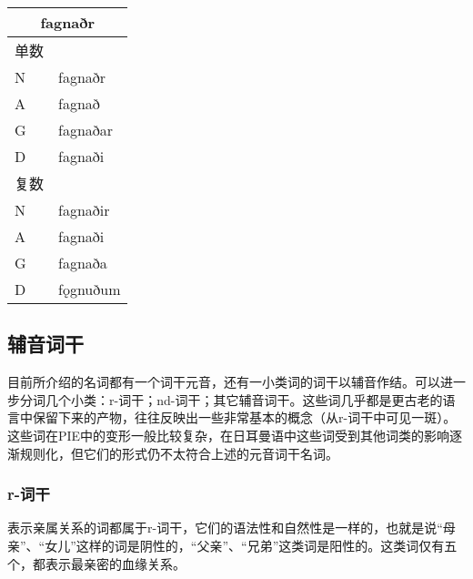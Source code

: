 \begin{longtable}{ll}
  \toprule
  \multicolumn{2}{c}{\textbf{fagnaðr}} \\
  \midrule
  \endhead
  \bottomrule
  \endfoot
  单数 &                               \\
  N    & fagnaðr                       \\
  A    & fagnað                        \\
  G    & fagnaðar                      \\
  D    & fagnaði                       \\
  复数 &                               \\
  N    & fagnaðir                      \\
  A    & fagnaði                       \\
  G    & fagnaða                       \\
  D    & fǫgnuðum                      \\
\end{longtable}

\subsection{辅音词干}
\label{辅音词干}

目前所介绍的名词都有一个词干元音，还有一小类词的词干以辅音作结。可以进一步分词几个小类：r-词干；nd-词干；其它辅音词干。这些词几乎都是更古老的语言中保留下来的产物，往往反映出一些非常基本的概念（从r-词干中可见一斑）。这些词在PIE中的变形一般比较复杂，在日耳曼语中这些词受到其他词类的影响逐渐规则化，但它们的形式仍不太符合上述的元音词干名词。

\subsubsection{r-词干}

表示亲属关系的词都属于r-词干，它们的语法性和自然性是一样的，也就是说``母亲''、``女儿''这样的词是阴性的，``父亲''、``兄弟''这类词是阳性的。这类词仅有五个，都表示最亲密的血缘关系。

